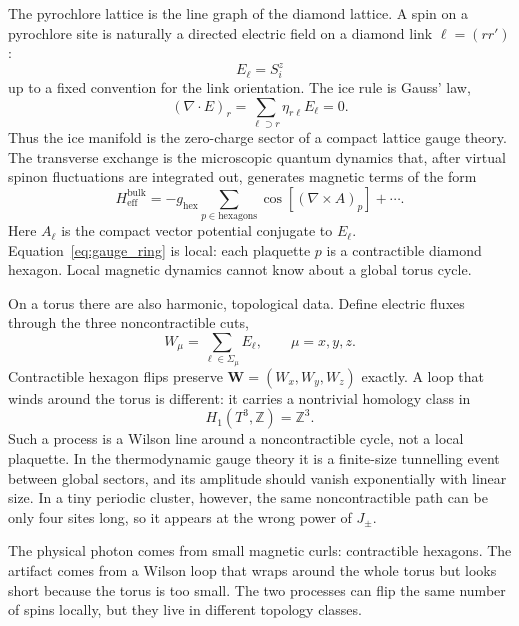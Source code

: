 \documentclass[11pt,letterpaper]{article}
\newcommand{\Jpm}{J_{\pm}}
\newcommand{\Heff}{H_{\mathrm{eff}}}
\newcommand{\bW}{\bm W}
\newcommand{\Z}{\mathbb Z}
\theoremstyle{plain}
\theoremstyle{definition}
\begin{document}
The pyrochlore lattice is the line graph of the diamond lattice.  A spin on a
pyrochlore site is naturally a directed electric field on a diamond link
$\ell=(rr')$:
\begin{equation}
E_{\ell}=S^z_i
\end{equation}
up to a fixed convention for the link orientation.  The ice rule is Gauss'
law,
\begin{equation}
(\nabla\cdot E)_r=\sum_{\ell\supset r}\eta_{r\ell}E_\ell=0.
\label{eq:gauss_law}
\end{equation}
Thus the ice manifold is the zero-charge sector of a compact lattice gauge
theory.  The transverse exchange is the microscopic quantum dynamics that,
after virtual spinon fluctuations are integrated out, generates magnetic
terms of the form
\begin{equation}
\Heff^{\mathrm{bulk}}
=-g_{\mathrm{hex}}\sum_{p\in\mathrm{hexagons}}
\cos\!\left[(\nabla\times A)_p\right]+\cdots .
\label{eq:gauge_ring}
\end{equation}
Here $A_\ell$ is the compact vector potential conjugate to $E_\ell$.
Equation~\eqref{eq:gauge_ring} is local: each plaquette $p$ is a
contractible diamond hexagon.  Local magnetic dynamics cannot know about a
global torus cycle.

On a torus there are also harmonic, topological data.  Define electric fluxes
through the three noncontractible cuts,
\begin{equation}
W_\mu=\sum_{\ell\in\Sigma_\mu} E_\ell,\qquad \mu=x,y,z.
\label{eq:electric_flux}
\end{equation}
Contractible hexagon flips preserve $\bW=(W_x,W_y,W_z)$ exactly.  A loop
that winds around the torus is different: it carries a nontrivial homology
class in
\begin{equation}
H_1(T^3,\Z)=\Z^3 .
\end{equation}
Such a process is a Wilson line around a noncontractible cycle, not a local
plaquette.  In the thermodynamic gauge theory it is a finite-size tunnelling
event between global sectors, and its amplitude should vanish exponentially
with linear size.  In a tiny periodic cluster, however, the same
noncontractible path can be only four sites long, so it appears at the wrong
power of $\Jpm$.

\begin{intuition}
The physical photon comes from small magnetic curls: contractible hexagons.
The artifact comes from a Wilson loop that wraps around the whole torus but
looks short because the torus is too small.  The two processes can flip the
same number of spins locally, but they live in different topology classes.
\end{intuition}
\end{document}
